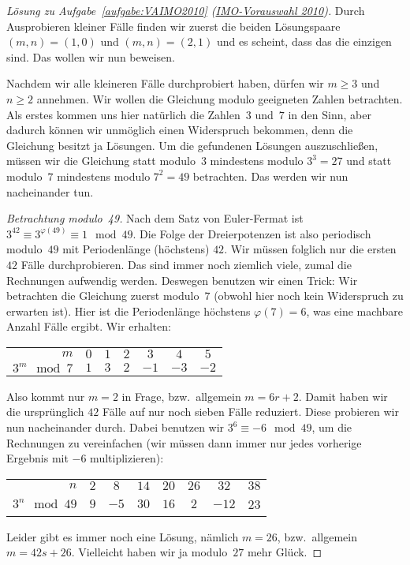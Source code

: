 \begin{proof}[Lösung zu Aufgabe~\ref{aufgabe:VAIMO2010} \textmd{(\href{https://www.mathe-wettbewerbe.de/fileadmin/Mathe-Wettbewerbe/AIMO/Aufgaben_und_Loesungen_AIMO/aufgaben_awb_10.pdf}{IMO-Vorauswahl 2010})}]
	Durch Ausprobieren kleiner Fälle finden wir zuerst die beiden Lösungspaare $(m,n)=(1,0)$ und $(m,n)=(2,1)$ und es scheint, dass das die einzigen sind. Das wollen wir nun beweisen.
	
	Nachdem wir alle kleineren Fälle durchprobiert haben, dürfen wir $m\geqslant 3$ und $n\geqslant 2$ annehmen. Wir wollen die Gleichung modulo geeigneten Zahlen betrachten. Als erstes kommen uns hier natürlich die Zahlen~$3$ und~$7$ in den Sinn, aber dadurch können wir unmöglich einen Widerspruch bekommen, denn die Gleichung besitzt ja Lösungen. Um die gefundenen Lösungen auszuschließen, müssen wir die Gleichung statt modulo~$3$ mindestens modulo $3^3=27$ und statt modulo~$7$ mindestens modulo $7^2=49$ betrachten. Das werden wir nun nacheinander tun.
	
	\emph{Betrachtung modulo~49.} Nach dem Satz von Euler-Fermat ist $3^{42}\equiv 3^{\varphi(49)}\equiv 1\mod 49$. Die Folge der Dreierpotenzen ist also periodisch modulo~$49$ mit Periodenlänge (höchstens) $42$. Wir müssen folglich nur die ersten~$42$ Fälle durchprobieren. Das sind immer noch ziemlich viele, zumal die Rechnungen aufwendig werden. Deswegen benutzen wir einen Trick: Wir betrachten die Gleichung zuerst modulo~$7$ (obwohl hier noch kein Widerspruch zu erwarten ist). Hier ist die Periodenlänge höchstens $\varphi(7)=6$, was eine machbare Anzahl Fälle ergibt. Wir erhalten:
	\begin{center}
		\begin{tabular}{r | c c c c c c}\toprule
			$m$ & $0$ & $1$ & $2$ & $3$ & $4$ & $5$ \\%
			$3^m\mod 7$ & $1$ & $3$ & $2$ & $-1$ & $-3$ & $-2$\\\bottomrule
		\end{tabular}
	\end{center}
	Also kommt nur $m=2$ in Frage, bzw.\ allgemein $m=6r+2$. Damit haben wir die ursprünglich $42$ Fälle auf nur noch sieben Fälle reduziert. Diese probieren wir nun nacheinander durch. Dabei benutzen wir $3^6\equiv -6\mod 49$, um die Rechnungen zu vereinfachen (wir müssen dann immer nur jedes vorherige Ergebnis mit $-6$ multiplizieren):
	\begin{center}
		\begin{tabular}{r | c c c c c c c}\toprule
			$n$ & $2$ & $8$ & $14$ & $20$ & $26$ & $32$ & $38$ \\%
			$3^n\mod 49$ & $9$ & $-5$ & $30$ & $16$ & $2$ & $-12$ & 23\\\bottomrule
		\end{tabular}
	\end{center}
	Leider gibt es immer noch eine Lösung, nämlich $m=26$, bzw.\ allgemein $m=42s+26$. Vielleicht haben wir ja modulo~$27$ mehr Glück.
	

\end{proof}
